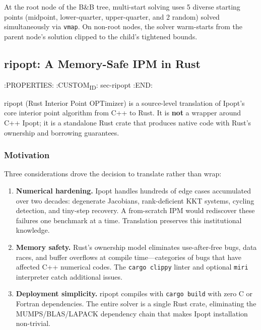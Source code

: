 \documentclass[12pt,preprint]{article}
\begin{document}
At the root node of the B\&B tree, multi-start solving uses 5 diverse starting points (midpoint, lower-quarter, upper-quarter, and 2 random) solved simultaneously via \texttt{vmap}. On non-root nodes, the solver warm-starts from the parent node's solution clipped to the child's tightened bounds.

\subsection{ripopt: A Memory-Safe IPM in Rust}
\label{org-ripopt-a-memory-safe-ipm-in-rust}
   :PROPERTIES:
   :CUSTOM\textsubscript{ID}: sec-ripopt
   :END:


ripopt (Rust Interior Point OPTimizer) is a source-level translation of Ipopt's core interior point algorithm from C++ to Rust. It is \textbf{not} a wrapper around C++ Ipopt; it is a standalone Rust crate that produces native code with Rust's ownership and borrowing guarantees.

\subsubsection{Motivation}
\label{org-motivation}
Three considerations drove the decision to translate rather than wrap:


\begin{enumerate}
\item \textbf{Numerical hardening.} Ipopt handles hundreds of edge cases accumulated over two decades: degenerate Jacobians, rank-deficient KKT systems, cycling detection, and tiny-step recovery. A from-scratch IPM would rediscover these failures one benchmark at a time. Translation preserves this institutional knowledge.

\item \textbf{Memory safety.} Rust's ownership model eliminates use-after-free bugs, data races, and buffer overflows at compile time---categories of bugs that have affected C++ numerical codes. The \texttt{cargo clippy} linter and optional \texttt{miri} interpreter catch additional issues.

\item \textbf{Deployment simplicity.} ripopt compiles with \texttt{cargo build} with zero C or Fortran dependencies. The entire solver is a single Rust crate, eliminating the MUMPS/BLAS/LAPACK dependency chain that makes Ipopt installation non-trivial.

\end{enumerate}
\end{document}
